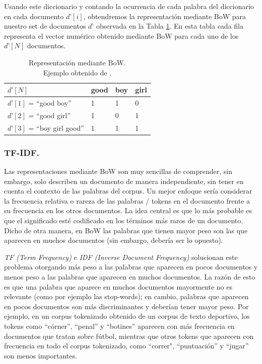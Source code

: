 \documentclass[12pt,a4paper]{article}
\begin{document}
\begin{sloppypar}
Usando este diccionario y contando la ocurrencia de cada palabra del diccionario en cada documento $d’[i]$, obtendremos la representación mediante BoW para nuestro set de documentos $d’$ observada en la Tabla \ref{table:bow_3}. En esta tabla cada fila representa el vector numérico obtenido mediante BoW para cada uno de los $d’[N]$ documentos.

\begin{table}[h!]
\centering
\begin{tabular}{|p{5cm}||p{1cm}|p{1cm}|p{1cm}|}
\hline
\centering $d’[N]$ & \textbf{good} & \textbf{boy} & \textbf{girl} \\ [1ex]
\hline
$d’[1]$ = ``good boy'' & 1 & 1 & 0 \\
\hline
$d’[2]$ = ``good girl'' & 1 & 0 & 1 \\
\hline
$d’[3]$ = ``boy girl good'' & 1 & 1 & 1 \\
\hline
\end{tabular}
\caption{Representación mediante BoW.\\ Ejemplo obtenido de \cite{NLP_2}.} 
\label{table:bow_3}
\end{table}

\subsubsection{TF-IDF.}\label{tf_idf}

Las representaciones mediante BoW son muy sencillas de comprender, sin embargo, solo describen un documento de manera independiente, sin tener en cuenta el contexto de las palabras del corpus. Un mejor enfoque sería considerar la frecuencia relativa o rareza de las palabras / tokens en el documento frente a su frecuencia en los otros documentos. La idea central es que lo más probable es que el significado esté codificado en los términos más raros de un documento. Dicho de otra manera, en BoW las palabras que tienen mayor peso son las que aparecen en muchos documentos (sin embargo, debería ser lo opuesto). 

\textit{TF (Term Frequency)} e \textit{IDF (Inverse Document Frequency)} solucionan este problema otorgando más peso a las palabras que aparecen en pocos documentos y menos peso a las palabras que aparecen en muchos documentos. La razón de esto es que una palabra que aparece en muchos documentos mayormente no es relevante (como por ejemplo las stop-words); en cambio, palabras que aparecen en pocos documentos son más discriminantes y deberían tener mayor peso. Por ejemplo, en un corpus tokenizado obtenido de un corpus de texto deportivo, los tokens como ``córner'', ``penal'' y ``botines'' aparecen con más frecuencia en documentos que tratan sobre fútbol, mientras que otros tokens que aparecen con frecuencia en todo el corpus tokenizado, como ``correr", ``puntuación'' y ``jugar'' son menos importantes\cite{NLP_7}.


\end{sloppypar}
\end{document}
